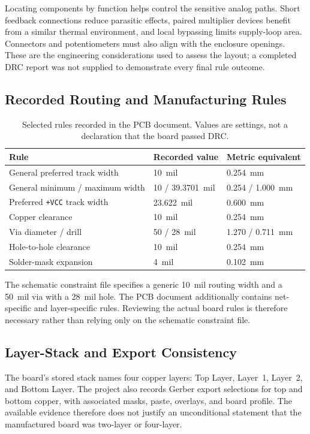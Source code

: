 \documentclass[11pt,a4paper]{article}
\begin{document}
Locating components by function helps control the sensitive analog paths. Short feedback connections reduce parasitic effects, paired multiplier devices benefit from a similar thermal environment, and local bypassing limits supply-loop area. Connectors and potentiometers must also align with the enclosure openings. These are the engineering considerations used to assess the layout; a completed DRC report was not supplied to demonstrate every final rule outcome.

\subsection{Recorded Routing and Manufacturing Rules}
\begin{table}[htbp]
\centering\small
\caption{Selected rules recorded in the PCB document. Values are settings, not a declaration that the board passed DRC.}
\begin{tabularx}{\textwidth}{P{0.40\textwidth}P{0.22\textwidth}Y}
\toprule
\textbf{Rule} & \textbf{Recorded value} & \textbf{Metric equivalent}\\
\midrule
General preferred track width & 10~mil & 0.254~mm\\
General minimum / maximum width & 10 / 39.3701~mil & 0.254 / 1.000~mm\\
Preferred \texttt{+VCC} track width & 23.622~mil & 0.600~mm\\
Copper clearance & 10~mil & 0.254~mm\\
Via diameter / drill & 50 / 28~mil & 1.270 / 0.711~mm\\
Hole-to-hole clearance & 10~mil & 0.254~mm\\
Solder-mask expansion & 4~mil & 0.102~mm\\
\bottomrule
\end{tabularx}
\end{table}

The schematic constraint file specifies a generic 10~mil routing width and a 50~mil via with a 28~mil hole. The PCB document additionally contains net-specific and layer-specific rules. Reviewing the actual board rules is therefore necessary rather than relying only on the schematic constraint file.

\subsection{Layer-Stack and Export Consistency}
The board's stored stack names four copper layers: Top Layer, Layer~1, Layer~2, and Bottom Layer. The project also records Gerber export selections for top and bottom copper, with associated masks, paste, overlays, and board profile. The available evidence therefore does not justify an unconditional statement that the manufactured board was two-layer or four-layer.
\end{document}
